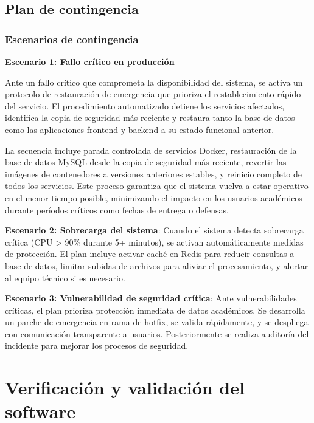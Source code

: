 \documentclass[12pt,a4paper,oneside]{report}
\begin{document}
\subsection{Plan de contingencia}\label{plan-de-contingencia}

\subsubsection{Escenarios de
contingencia}\label{escenarios-de-contingencia}

\textbf{Escenario 1: Fallo crítico en producción}

Ante un fallo crítico que comprometa la disponibilidad del sistema, se activa un protocolo de restauración de emergencia que prioriza el restablecimiento rápido del servicio. El procedimiento automatizado detiene los servicios afectados, identifica la copia de seguridad más reciente y restaura tanto la base de datos como las aplicaciones frontend y backend a su estado funcional anterior.

La secuencia incluye parada controlada de servicios Docker, restauración de la base de datos MySQL desde la copia de seguridad más reciente, revertir las imágenes de contenedores a versiones anteriores estables, y reinicio completo de todos los servicios. Este proceso garantiza que el sistema vuelva a estar operativo en el menor tiempo posible, minimizando el impacto en los usuarios académicos durante períodos críticos como fechas de entrega o defensas.

\textbf{Escenario 2: Sobrecarga del sistema}: Cuando el sistema detecta sobrecarga crítica (CPU > 90\% durante 5+ minutos), se activan automáticamente medidas de protección. El plan incluye activar caché en Redis para reducir consultas a base de datos, limitar subidas de archivos para aliviar el procesamiento, y alertar al equipo técnico si es necesario.

\textbf{Escenario 3: Vulnerabilidad de seguridad crítica}: Ante vulnerabilidades críticas, el plan prioriza protección inmediata de datos académicos. Se desarrolla un parche de emergencia en rama de hotfix, se valida rápidamente, y se despliega con comunicación transparente a usuarios. Posteriormente se realiza auditoría del incidente para mejorar los procesos de seguridad.

\section{Verificación y validación del
software}\label{verificaciuxf3n-y-validaciuxf3n-del-software}
\end{document}
